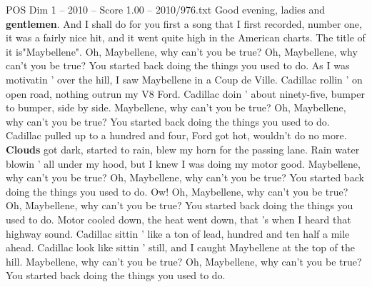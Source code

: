 \begin{textsample}{POS Dim 1 – 2010 – Score 1.00 – 2010/976.txt}  \label{ex:f1_pos_023}
Good evening, ladies and \textbf{gentlemen}.
And I shall do for you first a song that I first recorded, number one, it was a fairly nice hit, and it went quite high in the American charts.
The title of it is"Maybellene".
Oh, Maybellene, why can't you be true?
Oh, Maybellene, why can't you be true?
You started back doing the things you used to do.
As I was motivatin ' over the hill, I saw Maybellene in a Coup de Ville.
Cadillac rollin ' on open road, nothing outrun my V8 Ford.
Cadillac doin ' about ninety-five, bumper to bumper, side by side.
Maybellene, why can't you be true?
Oh, Maybellene, why can't you be true?
You started back doing the things you used to do.
Cadillac pulled up to a hundred and four, Ford got hot, wouldn't do no more. \textbf{Clouds} got dark, started to rain, blew my horn for the passing lane.
Rain water blowin ' all under my hood, but I knew I was doing my motor good.
Maybellene, why can't you be true?
Oh, Maybellene, why can't you be true?
You started back doing the things you used to do.
Ow!
Oh, Maybellene, why can't you be true?
Oh, Maybellene, why can't you be true?
You started back doing the things you used to do.
Motor cooled down, the heat went down, that 's when I heard that highway sound.
Cadillac sittin ' like a ton of lead, hundred and ten half a mile ahead.
Cadillac look like sittin ' still, and I caught Maybellene at the top of the hill.
Maybellene, why can't you be true?
Oh, Maybellene, why can't you be true?
You started back doing the things you used to do.

\end{textsample}
